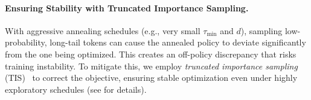 %

\paragraph{Ensuring Stability with Truncated  Importance Sampling.}
With aggressive annealing schedules (e.g., very small $\tau_\mathrm{min}$ and $d$), sampling low-probability, long-tail tokens can cause the annealed policy to deviate significantly from the one being optimized. This creates an off-policy discrepancy that risks training instability.  To mitigate this, we employ \emph{truncated importance sampling} (TIS)~\citep{heckman1998matching, hilton2022batch, yao2025offpolicy} to correct the objective, ensuring stable optimization even under highly exploratory schedules (see  for details).


